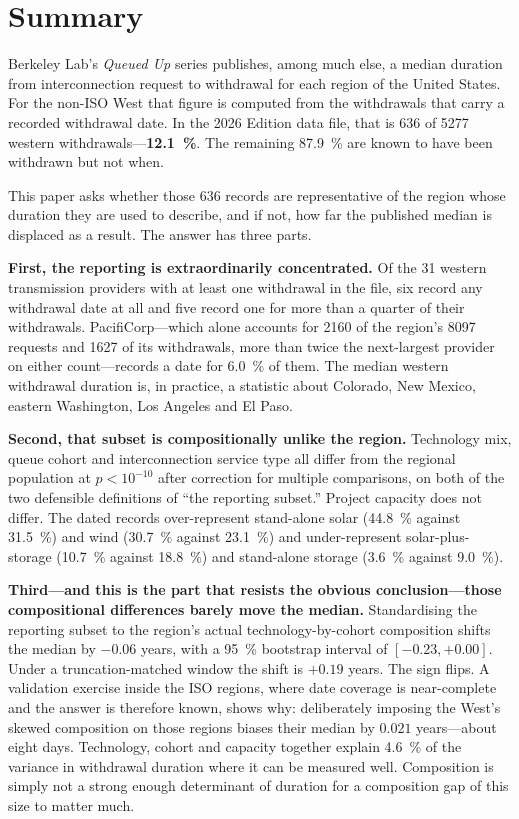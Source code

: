 \documentclass[11pt,a4paper]{article}
\begin{document}
\section*{Summary}

Berkeley Lab's \emph{Queued Up} series publishes, among much else, a median
duration from interconnection request to withdrawal for each region of the
United States. For the non-ISO West that figure is computed from the withdrawals
that carry a recorded withdrawal date. In the 2026 Edition data file, that is 636
of \num{5277} western withdrawals---\textbf{\SI{12.1}{\percent}}. The remaining
\SI{87.9}{\percent} are known to have been withdrawn but not when.

This paper asks whether those 636 records are representative of the region whose
duration they are used to describe, and if not, how far the published median is
displaced as a result. The answer has three parts.

\textbf{First, the reporting is extraordinarily concentrated.} Of the 31 western
transmission providers with at least one withdrawal in the file, six record any
withdrawal date at all and five record one for more than a quarter of their
withdrawals. PacifiCorp---which alone accounts for \num{2160} of the region's
\num{8097} requests and \num{1627} of its withdrawals, more than twice the
next-largest provider on either count---records a date for \SI{6.0}{\percent} of
them. The median western withdrawal duration is, in practice, a statistic about
Colorado, New Mexico, eastern Washington, Los Angeles and El Paso.

\textbf{Second, that subset is compositionally unlike the region.} Technology
mix, queue cohort and interconnection service type all differ from the regional
population at $p < 10^{-10}$ after correction for multiple comparisons, on both
of the two defensible definitions of ``the reporting subset.'' Project capacity
does not differ. The dated records over-represent stand-alone solar
(\SI{44.8}{\percent} against \SI{31.5}{\percent}) and wind (\SI{30.7}{\percent}
against \SI{23.1}{\percent}) and under-represent solar-plus-storage
(\SI{10.7}{\percent} against \SI{18.8}{\percent}) and stand-alone storage
(\SI{3.6}{\percent} against \SI{9.0}{\percent}).

\textbf{Third---and this is the part that resists the obvious conclusion---those
compositional differences barely move the median.} Standardising the reporting
subset to the region's actual technology-by-cohort composition shifts the median
by $-0.06$ years, with a \SI{95}{\percent} bootstrap interval of $[-0.23,
+0.00]$. Under a truncation-matched window the shift is $+0.19$ years. The sign
flips. A validation exercise inside the ISO regions, where date coverage is
near-complete and the answer is therefore known, shows why: deliberately imposing
the West's skewed composition on those regions biases their median by $0.021$
years---about eight days. Technology, cohort and capacity together explain
\SI{4.6}{\percent} of the variance in withdrawal duration where it can be
measured well. Composition is simply not a strong enough determinant of duration
for a composition gap of this size to matter much.
\end{document}
